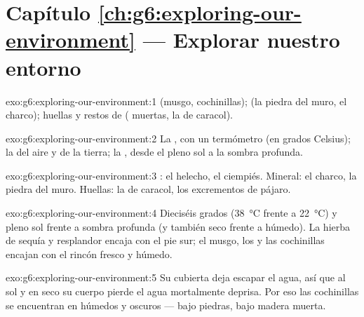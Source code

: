 \section*{Capítulo \ref{ch:g6:exploring-our-environment} --- Explorar nuestro entorno}

\begin{solution}{exo:g6:exploring-our-environment:1}
 (musgo, cochinillas);  (la piedra del muro,
el charco); huellas y restos de  ( muertas, la 
de caracol).
\end{solution}

\begin{solution}{exo:g6:exploring-our-environment:2}
La , con un termómetro (en grados Celsius); la  del
aire y de la tierra; la , desde el pleno sol a la sombra profunda.
\end{solution}

\begin{solution}{exo:g6:exploring-our-environment:3}
: el helecho, el ciempiés. Mineral: el charco, la piedra
del muro. Huellas: la  de caracol, los excrementos de pájaro.
\end{solution}

\begin{solution}{exo:g6:exploring-our-environment:4}
Dieciséis grados (\qty{38}{\degreeCelsius} frente a
\qty{22}{\degreeCelsius}) y pleno sol frente a sombra profunda (y
también seco frente a húmedo). La hierba de sequía y resplandor encaja
con el pie sur; el musgo, los  y las cochinillas encajan con
el rincón fresco y húmedo.
\end{solution}

\begin{solution}{exo:g6:exploring-our-environment:5}
Su cubierta deja escapar el agua, así que al sol y en seco su cuerpo
pierde el agua mortalmente deprisa. Por eso las cochinillas se
encuentran en  húmedos y oscuros --- bajo piedras, bajo
madera muerta.
\end{solution}

